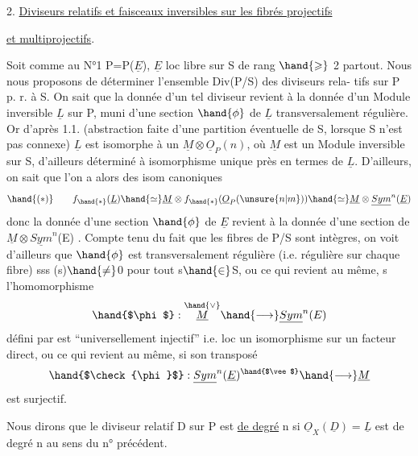 
2. \uline{Diviseurs relatifs et faisceaux inversibles sur les fibrés projectifs}

\uline{et multiprojectifs}.

 Soit comme au N°1 P=P($\underline{E}$), $\underline{E}$ loc libre sur S de rang $\hand{\geqslant}$ 2 partout.
Nous nous proposons de déterminer l'ensemble Div(P/S) des diviseurs rela-%
tifs  sur P p. r. à S. On sait que la donnée d'un tel diviseur revient à la
donnée d'un Module inversible $\underline{L}$ sur P, muni d'une section $\hand{\phi}$ de $\underline{L}$
transversalement régulière. Or d'après 1.1. (abstraction faite d'une
partition éventuelle de S, lorsque S n'est pas connexe) $\underline{L}$ est isomorphe
à un $\underline{M}\otimes\underline{O}_P(n)$, où $\underline{M}$ est un Module inversible sur S, d'ailleurs déterminé
à isomorphisme unique près en termes de $\underline{L}$. D'ailleurs, on sait que
l'on a alors des isom canoniques
\[ \hand{(*)} \qquad f_{\hand{*}}(\underline{L}) \hand{\simeq} \underline{M}\otimes f_{\hand{*}}(\underline{O}_P(\unsure{n|m})) \hand{\simeq} \underline{M}\otimes\underline{Sym}^n(\underline{E}) \]
donc la donnée d'une section  $\hand{\phi}$ de $\underline{E}$ revient à la donnée d'une section
\inserted{$\phi$} de $\underline{M}\otimes\underline{Sym}^n$(E) . Compte tenu du fait que les fibres de P/S sont intègres,
on voit d'ailleurs que $\hand{\phi}$ est transversalement régulière (i.e. régulière
sur chaque fibre) sss \hand{$\phi$}(s)$\hand{\neq}$0 pour tout s$\hand{\in}$S, ou ce qui revient au même,
s l'homomorphisme
\[ \hand{$\phi$} : \overset{\hand{\vee}}{\underline{M}} \hand{\longrightarrow} \underline{Sym}^n(E) \]
défini par \hand{$\phi$} est ``universellement injectif'' i.e. loc un isomorphisme sur
un facteur direct, ou ce qui revient au même, si son transposé
\[ \hand{$\check{\phi}$} : \underline{Sym}^n(\underline{E})^{\hand{$\vee$}} \hand{\longrightarrow} \underline{M} \]
est surjectif.

Nous dirons que le diviseur relatif D sur P est \uline{de degré} n
si $\underline{O}_X(\underline{D})= \underline{L}$ est de degré n au sens du n° précédent. 

